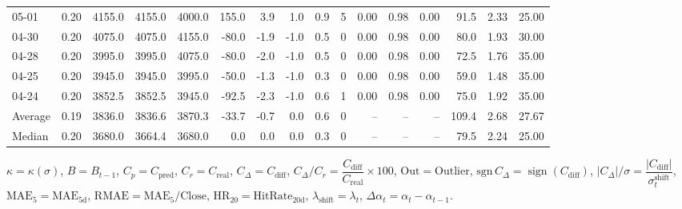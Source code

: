 \begin{threeparttable}
{\begin{tabular}{lrrrrrrrrrrrrrrr}
  05-01 &     0.20 & 4155.0 & 4155.0 & 4000.0 &      155.0 &            3.9 &                      1.0 &                 0.9 &              5 &       0.00 &      0.98 &           0.00 &             91.5 &            2.33 &                  25.00 \\
  04-30 &     0.20 & 4075.0 & 4075.0 & 4155.0 &      -80.0 &           -1.9 &                     -1.0 &                 0.5 &              0 &       0.00 &      0.98 &           0.00 &             80.0 &            1.93 &                  30.00 \\
  04-28 &     0.20 & 3995.0 & 3995.0 & 4075.0 &      -80.0 &           -2.0 &                     -1.0 &                 0.5 &              0 &       0.00 &      0.98 &           0.00 &             72.5 &            1.76 &                  35.00 \\
  04-25 &     0.20 & 3945.0 & 3945.0 & 3995.0 &      -50.0 &           -1.3 &                     -1.0 &                 0.3 &              0 &       0.00 &      0.98 &           0.00 &             59.0 &            1.48 &                  35.00 \\
  04-24 &     0.20 & 3852.5 & 3852.5 & 3945.0 &      -92.5 &           -2.3 &                     -1.0 &                 0.6 &              1 &       0.00 &      0.98 &           0.00 &             75.0 &            1.92 &                  35.00 \\
Average &     0.19 & 3836.0 & 3836.6 & 3870.3 &      -33.7 &           -0.7 &                      0.0 &                 0.6 &              0 &         -- &        -- &             -- &            109.4 &            2.68 &                  27.67 \\
 Median &     0.20 & 3680.0 & 3664.4 & 3680.0 &        0.0 &            0.0 &                      0.0 &                 0.3 &              0 &         -- &        -- &             -- &             79.5 &            2.24 &                  25.00 \\
\bottomrule
\end{tabular}
}
\begin{tablenotes}\footnotesize
\item $\kappa=\kappa(\sigma)$, $B=B_{t-1}$, $C_p=C_{\text{pred}}$, $C_r=C_{\text{real}}$, $C_\Delta=C_{\text{diff}}$, $C_\Delta/C_r=\dfrac{C_{\text{diff}}}{C_{\text{real}}}\times100$, $\mathrm{Out}=\text{Outlier}$, $\mathrm{sgn}\,C_\Delta=\operatorname{sign}(C_{\text{diff}})$, $|C_\Delta|/\sigma=\dfrac{|C_{\text{diff}}|}{\sigma_t^{\text{shift}}}$, $\mathrm{MAE}_5=\mathrm{MAE}_{5\text{d}}$, $\mathrm{RMAE}= \mathrm{MAE}_5 / \text{Close}$, $\mathrm{HR}_{20}=\mathrm{HitRate}_{20\text{d}}$, 
$\lambda_{\text{shift}}=\lambda_t$, 
$\Delta\alpha_t=\alpha_t-\alpha_{t-1}$.
\end{tablenotes}
\end{threeparttable}
\endgroup


